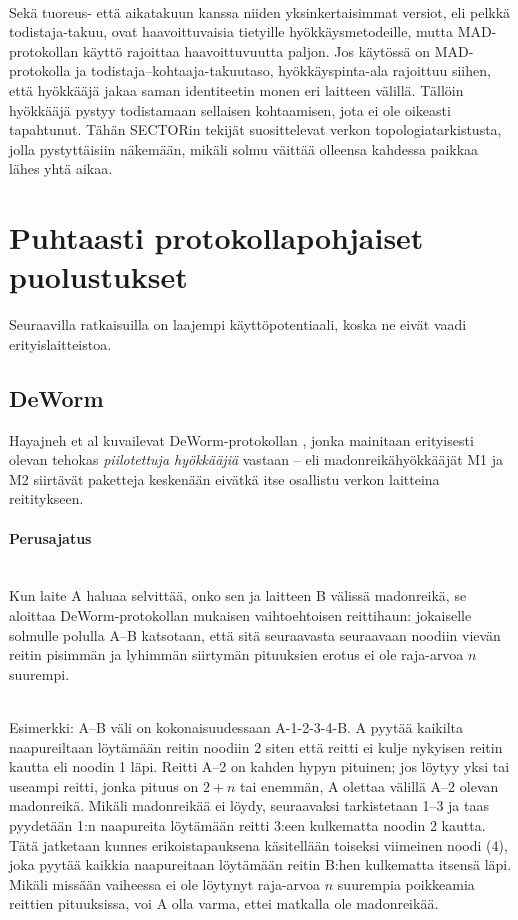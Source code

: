 \documentclass[finnish]{tktltiki2}
\theoremstyle{definition}
\theoremstyle{remark}
\begin{document}
\noindent\\
Sekä tuoreus- että aikatakuun kanssa niiden yksinkertaisimmat versiot, eli pelkkä todistaja-takuu, ovat haavoittuvaisia tietyille hyökkäysmetodeille, mutta MAD-protokollan käyttö rajoittaa haavoittuvuutta paljon. Jos käytössä on MAD-protokolla ja todistaja--kohtaaja-takuutaso, hyökkäyspinta-ala rajoittuu siihen, että hyökkääjä jakaa saman identiteetin monen eri laitteen välillä. Tällöin hyökkääjä pystyy todistamaan sellaisen kohtaamisen, jota ei ole oikeasti tapahtunut. Tähän SECTORin tekijät suosittelevat verkon topologiatarkistusta, jolla pystyttäisiin näkemään, mikäli solmu väittää olleensa kahdessa paikkaa lähes yhtä aikaa.


\section{Puhtaasti protokollapohjaiset puolustukset}
Seuraavilla ratkaisuilla on laajempi käyttöpotentiaali, koska ne eivät vaadi erityislaitteistoa.

% 
% 
% 
% 
% 
% 
% 
% 
% 
% 
% 
% 
% 
% 
\subsection{DeWorm}
% 
% 
% 
% 
% 
% 
% 
% 
% 
% 
% 
% 
% 
% 

Hayajneh et al kuvailevat DeWorm-protokollan \cite{deworm}, jonka mainitaan erityisesti olevan tehokas \emph{piilotettuja hyökkääjiä} vastaan -- eli madonreikähyökkääjät M1 ja M2 siirtävät paketteja keskenään eivätkä itse osallistu verkon laitteina reititykseen.

\paragraph{Perusajatus}
\noindent \\
Kun laite A haluaa selvittää, onko sen ja laitteen B välissä madonreikä, se aloittaa DeWorm-protokollan mukaisen vaihtoehtoisen reittihaun: jokaiselle solmulle polulla A--B katsotaan, että sitä seuraavasta seuraavaan noodiin vievän reitin pisimmän ja lyhimmän siirtymän pituuksien erotus ei ole raja-arvoa $n$ suurempi. 

\noindent \\
Esimerkki: A--B väli on kokonaisuudessaan A-1-2-3-4-B. A pyytää kaikilta naapureiltaan löytämään reitin noodiin 2 siten että reitti ei kulje nykyisen reitin kautta eli noodin 1 läpi. Reitti A--2 on kahden hypyn pituinen; jos löytyy yksi tai useampi reitti, jonka pituus on $2 + n$ tai enemmän, A olettaa välillä A--2 olevan madonreikä. Mikäli madonreikää ei löydy, seuraavaksi tarkistetaan 1--3 ja taas pyydetään 1:n naapureita löytämään reitti 3:een kulkematta noodin 2 kautta. Tätä jatketaan kunnes erikoistapauksena käsitellään toiseksi viimeinen noodi (4), joka pyytää kaikkia naapureitaan löytämään reitin B:hen kulkematta itsensä läpi. Mikäli missään vaiheessa ei ole löytynyt raja-arvoa $n$ suurempia poikkeamia reittien pituuksissa, voi A olla varma, ettei matkalla ole madonreikää.
\end{document}
